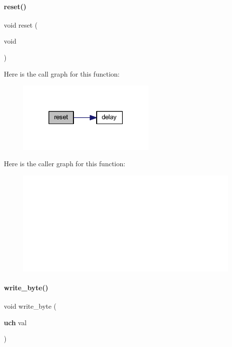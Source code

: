 \paragraph{reset()}
{\footnotesize\ttfamily void reset (\begin{DoxyParamCaption}\item[{void}]{ }\end{DoxyParamCaption})}

Here is the call graph for this function\+:
\nopagebreak
\begin{figure}[H]
\begin{center}
\leavevmode
\includegraphics[width=194pt]{a00047_a3aea9deb2a0bfea9ff05a898f4822e31_cgraph}
\end{center}
\end{figure}
Here is the caller graph for this function\+:
\nopagebreak
\begin{figure}[H]
\begin{center}
\leavevmode
\includegraphics[width=350pt]{a00047_a3aea9deb2a0bfea9ff05a898f4822e31_icgraph}
\end{center}
\end{figure}
\mbox{\label{a00047_ae8485e14c60e10731e2a3dcdc723b099}} 
\paragraph{write\+\_\+byte()}
{\footnotesize\ttfamily void write\+\_\+byte (\begin{DoxyParamCaption}\item[{\textbf{ uch}}]{val }\end{DoxyParamCaption})}

